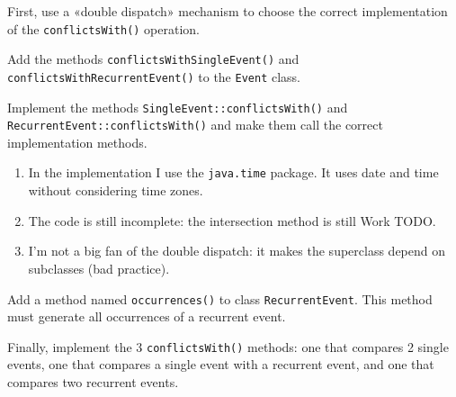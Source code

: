 \documentclass[a4paper,11pt]{memoir}
\newcommand{\code}[1]{\lstinline{#1}}
\begin{document}
\begin{question}
	First, use a «double dispatch» mechanism to choose the correct implementation of the \code{conflictsWith()} operation.
	
	\begin{inparaenum}[(A)]
		\item Add the methods \code{conflictsWithSingleEvent()} and \code{conflictsWithRecurrentEvent()} to the \code{Event} class.
		\item Implement the methods \code{SingleEvent::conflictsWith()} and \code{RecurrentEvent::conflictsWith()} and make them call the correct implementation methods.
	\end{inparaenum}
\end{question}

\begin{solution}
\begin{enumerate}
	\item In the implementation I use the \code{java.time} package. It uses date and time without considering time zones.
	\item The code is still incomplete: the intersection method is still Work TODO.
	\item I'm not a big fan of the double dispatch: it makes the superclass depend on subclasses (bad practice).
	
\end{enumerate}
\end{solution}

\begin{question}
Add a method named \code{occurrences()} to class \code{RecurrentEvent}.
This method must generate all occurrences of a recurrent event. 
\end{question}

\begin{solution}




\end{solution}

\begin{question}
Finally, implement the 3 \code{conflictsWith()} methods: one that compares 2 single events, one that compares a single event with
a recurrent event, and one that compares two recurrent events.
\end{question}
\end{document}
